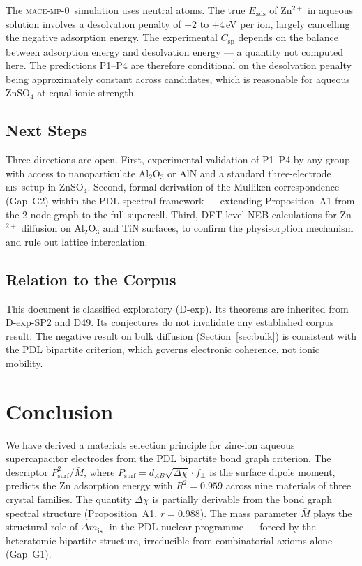 \documentclass[11pt,a4paper]{article}
\newcommand{\Eads}{E_{\mathrm{ads}}}
\newcommand{\Psurf}{P_{\mathrm{surf}}}
\newcommand{\Mmoy}{\bar{M}}
\newcommand{\DeltaEN}{\Delta\chi}
\newcommand{\fracZ}{f_{\perp}}
\newcommand{\Csp}{C_{\mathrm{sp}}}
\newcommand{\EIS}{\textsc{eis}}
\newcommand{\MACE}{\textsc{mace-mp-0}}
\begin{document}
The \MACE\ simulation uses neutral atoms. The true $\Eads$ of Zn$^{2+}$ in aqueous solution involves a desolvation penalty of $+2$ to $+4$\,eV per ion, largely cancelling the negative adsorption energy. The experimental $\Csp$ depends on the balance between adsorption energy and desolvation energy — a quantity not computed here. The predictions P1--P4 are therefore conditional on the desolvation penalty being approximately constant across candidates, which is reasonable for aqueous ZnSO$_4$ at equal ionic strength.

\subsection{Next Steps}

Three directions are open. First, experimental validation of P1--P4 by any group with access to nanoparticulate Al$_2$O$_3$ or AlN and a standard three-electrode \EIS\ setup in ZnSO$_4$. Second, formal derivation of the Mulliken correspondence (Gap~G2) within the PDL spectral framework — extending Proposition~A1 from the 2-node graph to the full supercell. Third, DFT-level NEB calculations for Zn$^{2+}$ diffusion on Al$_2$O$_3$ and TiN surfaces, to confirm the physisorption mechanism and rule out lattice intercalation.

\subsection{Relation to the Corpus}

This document is classified exploratory (D-exp). Its theorems are inherited from D-exp-SP2 and D49. Its conjectures do not invalidate any established corpus result. The negative result on bulk diffusion (Section~\ref{sec:bulk}) is consistent with the PDL bipartite criterion, which governs electronic coherence, not ionic mobility.

\section{Conclusion}

We have derived a materials selection principle for zinc-ion aqueous supercapacitor electrodes from the PDL bipartite bond graph criterion. The descriptor $\Psurf^2/\Mmoy$, where $\Psurf = d_{AB}\sqrt{\DeltaEN}\cdot\fracZ$ is the surface dipole moment, predicts the Zn adsorption energy with $R^2 = 0.959$ across nine materials of three crystal families. The quantity $\DeltaEN$ is partially derivable from the bond graph spectral structure (Proposition~A1, $r = 0.988$). The mass parameter $\Mmoy$ plays the structural role of $\Delta m_{\mathrm{iso}}$ in the PDL nuclear programme — forced by the heteratomic bipartite structure, irreducible from combinatorial axioms alone (Gap~G1).
\end{document}
